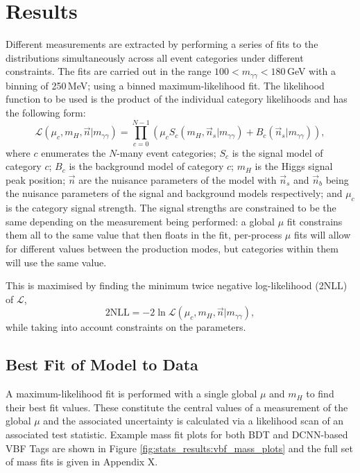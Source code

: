 \section{Results}
Different measurements are extracted by performing a series of fits to the \mgg distributions simultaneously across all event categories under different constraints. 
The fits are carried out in the range $100 < m_{\gamma\gamma} < 180$\,GeV with a binning of 250\,MeV; using a binned maximum-likelihood fit.
The likelihood function to be used is the product of the individual category likelihoods and has the following form:
\begin{equation}
    \mathcal{L}(\mu_{c},m_H,\vec{n}|m_{\gamma\gamma}) = \prod_{c=0}^{N-1} \left( \mu_{c} S_{c}( m_{H}, \vec{n}_{s} | m_{\gamma\gamma}) + B_{c}( \vec{n}_{s} | m_{\gamma\gamma}) \right),
\end{equation}
where $c$ enumerates the $N$-many event categories; $S_{c}$ is the signal model of category $c$; $B_{c}$ is the background model of category $c$; $m_H$ is the Higgs signal peak position; $\vec{n}$ are the nuisance parameters of the model with $\vec{n}_s$ and $\vec{n}_b$ being the nuisance parameters of the signal and background models respectively; and $\mu_{c}$ is the category signal strength. 
The signal strengths are constrained to be the same depending on the measurement being performed: a global $\mu$ fit constrains them all to the same value that then floats in the fit, per-process $\mu$ fits will allow for different values between the production modes, but categories within them will use the same value. 

This is maximised by finding the minimum twice negative log-likelihood (2NLL) of $\mathcal{L}$, 
\begin{equation}
    2\mathrm{NLL} = -2\ln\mathcal{L}(\mu_{c},m_H,\vec{n}|m_{\gamma\gamma}),
\end{equation}
while taking into account constraints on the parameters. 

\subsection{Best Fit of Model to Data}
A maximum-likelihood fit is performed with a single global $\mu$ and $m_H$ to find their best fit values.
These constitute the central values of a measurement of the global $\mu$ and the associated uncertainty is calculated via a likelihood scan of an associated test statistic. 
Example mass fit plots for both BDT and DCNN-based VBF Tags are shown in Figure \ref{fig:stats_results:vbf_mass_plots} and the full set of mass fits is given in Appendix X. 

